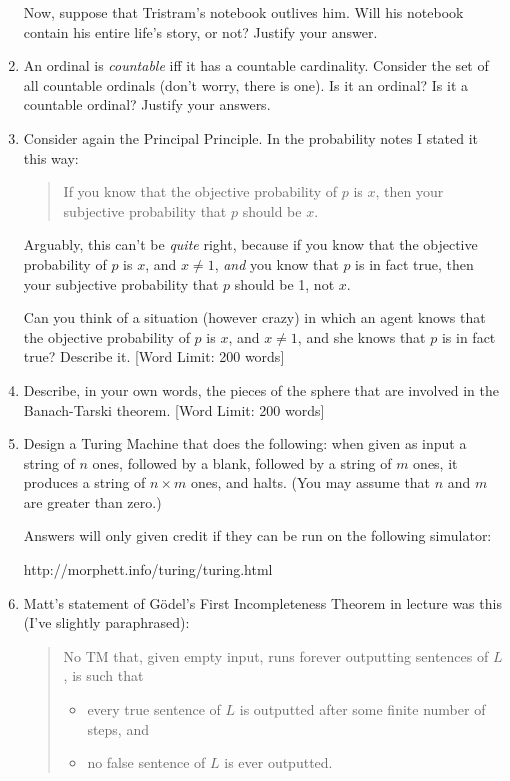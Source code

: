 \documentclass[12pt,a4paper]{article}
\begin{document}
\begin{enumerate}
Now, suppose that Tristram's notebook outlives him. Will his notebook contain his entire life's story, or not? Justify your answer.

\item An ordinal is \textsl{countable} iff it has a countable cardinality. Consider the set of all countable ordinals (don't worry, there is one). Is it an ordinal? Is it a countable ordinal? Justify your answers.

\item 
Consider again the Principal Principle. In the probability notes I stated it this way:
\begin{quote}
If you know that the objective probability of $p$ is $x$, then your subjective probability that $p$ should be $x$.
\end{quote}
Arguably, this can't be \emph{quite} right, because if you know that the objective probability of $p$ is $x$, and $x\neq 1$, \emph{and} you know that $p$ is in fact true, then your subjective probability that $p$ should be 1, not $x$.

Can you think of a situation (however crazy) in which an agent knows that the objective probability of $p$ is $x$, and $x\neq 1$, and she knows that $p$ is in fact true? Describe it. [Word Limit: 200 words]

\item Describe, in your own words, the pieces of the sphere that are involved in the Banach-Tarski theorem. [Word Limit: 200 words]

\item Design a Turing Machine that does the following: when given as input a string of $n$ ones, followed by a blank, followed by a string of $m$ ones, it produces a string of $n\times m$
ones, and halts. (You may assume that $n$ and $m$ are greater than zero.) 

Answers will only given credit if they can be run on the following simulator:
\begin{center}
http://morphett.info/turing/turing.html
\end{center}

\item Matt's statement of G\"odel's First Incompleteness Theorem in lecture was this (I've slightly paraphrased):
\begin{quote}
No TM that, given empty input, runs forever outputting sentences of $L$, is such that
\begin{itemize}
\item every true sentence of $L$ is outputted after some finite number of steps, and 
\item no false sentence of $L$ is ever outputted.
\end{itemize}
\end{quote}


\end{enumerate}
\end{document}
